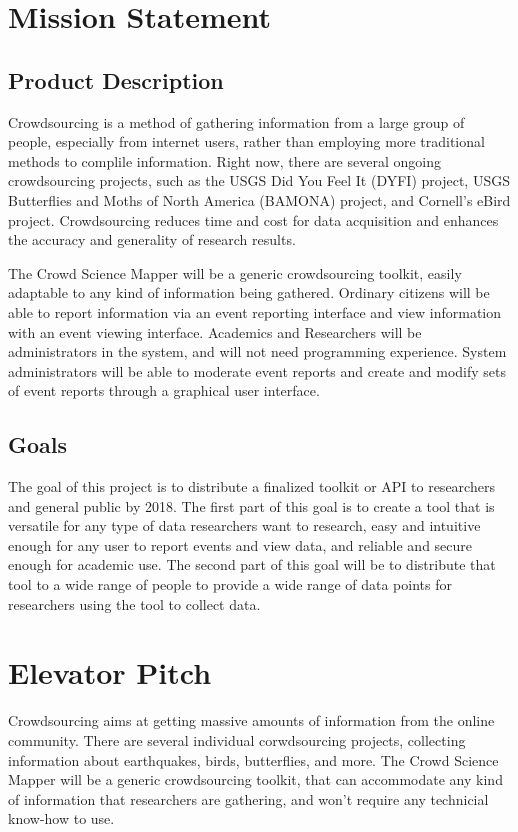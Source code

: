 
\section{Mission Statement}
\subsection{Product Description}

Crowdsourcing is a method of gathering information from a large group of people, especially from internet users, rather than employing more traditional methods to complile information. Right now, there are several ongoing crowdsourcing projects, such as the USGS Did You Feel It (DYFI) project, USGS Butterflies and Moths of North America (BAMONA) project, and Cornell’s eBird project. Crowdsourcing reduces time and cost for data acquisition and enhances the accuracy and generality of research results.

The Crowd Science Mapper will be a generic crowdsourcing toolkit, easily adaptable to any kind of information being gathered. Ordinary citizens will be able to report information via an event reporting interface and view information with an event viewing interface. Academics and Researchers will be administrators in the system, and will not need programming experience. System administrators will be able to moderate event reports and create and modify sets of event reports through a graphical user interface. 

\subsection{Goals}
The goal of this project is to distribute a finalized toolkit or API to researchers and general public by 2018. The first part of this goal is to create a tool that is versatile for any type of data researchers want to research, easy and intuitive enough for any user to report events and view data, and reliable and secure enough for academic use. The second part of this goal will be to distribute that tool to a wide range of people to provide a wide range of data points for researchers using the tool to collect data. 

\section{Elevator Pitch}
Crowdsourcing aims at getting massive amounts of information from the online community. There are several individual corwdsourcing projects, collecting information about earthquakes, birds, butterflies, and more. The Crowd Science Mapper will be a generic crowdsourcing toolkit, that can accommodate any kind of information that researchers are gathering, and won't require any technicial know-how to use. 